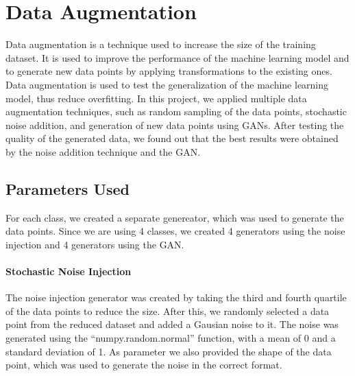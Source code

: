 \section{Data Augmentation}
Data augmentation is a technique used to increase the size of the training dataset.
It is used to improve the performance of the machine learning model and to generate new data points by applying transformations to the existing ones.
Data augmentation is used to test the generalization of the machine learning model, thus reduce overfitting.
In this project, we applied multiple data augmentation techniques, such as random sampling of the data points, stochastic noise addition, and generation of new data points using GANs.
After testing the quality of the generated data, we found out that the best results were obtained by the noise addition technique and the GAN.

\subsection*{Parameters Used}
For each class, we created a separate genereator, which was used to generate the data points.
Since we are using 4 classes, we created 4 generators using the noise injection and 4 generators using the GAN.
\paragraph*{Stochastic Noise Injection}
The noise injection generator was created by taking the third and fourth quartile of the data points to reduce the size.
After this, we randomly selected a data point from the reduced dataset and added a Gausian noise to it.
The noise was generated using the ``numpy.random.normal'' function, with a mean of 0 and a standard deviation of 1.
As parameter we also provided the shape of the data point, which was used to generate the noise in the correct format.
